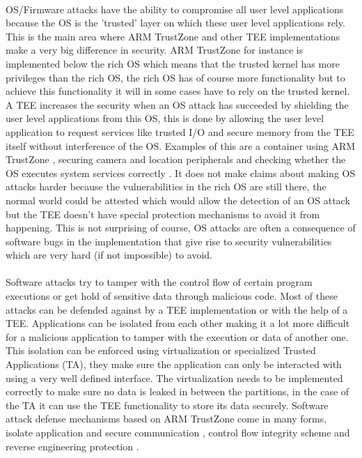 \paragraph*{}
OS/Firmware attacks have the ability to compromise all user level applications because the OS is the 'trusted' layer on which these user level applications rely. This is the main area where ARM TrustZone and other TEE implementations make a very big difference in security. ARM TrustZone for instance is implemented below the rich OS which means that the trusted kernel has more privileges than the rich OS, the rich OS has of course more functionality but to achieve this functionality it will in some cases have to rely on the trusted kernel. A TEE increases the security when an OS attack has succeeded by shielding the user level applications from this OS, this is done by allowing the user level application to request services like trusted I/O and secure memory from the TEE itself without interference of the OS. Examples of this are a container using ARM TrustZone \cite{HuaZhichao2021Tpcf}, securing camera and location peripherals \cite{SalmanAmmarS2021SMSG} and checking whether the OS executes system services correctly \cite{GuanLe2017TSEo}. It does not make claims about making OS attacks harder because the vulnerabilities in the rich OS are still there, the normal world could be attested which would allow the detection of an OS attack but the TEE doesn't have special protection mechanisms to avoid it from happening. This is not surprising of course, OS attacks are often a consequence of software bugs in the implementation that give rise to security vulnerabilities which are very hard (if not impossible) to avoid.

\paragraph*{}
Software attacks try to tamper with the control flow of certain program executions or get hold of sensitive data through malicious code. Most of these attacks can be defended against by a TEE implementation or with the help of a TEE. Applications can be isolated from each other making it a lot more difficult for a malicious application to tamper with the execution or data of another one. This isolation can be enforced using virtualization or specialized Trusted Applications (TA), they make sure the application can only be interacted with using a very well defined interface. The virtualization needs to be implemented correctly to make sure no data is leaked in between the partitions, in the case of the TA it can use the TEE functionality to store its data securely. Software attack defense mechanisms based on ARM TrustZone come in many forms, isolate application and secure communication \cite{ZhangDiming2020iIfs}, control flow integrity scheme \cite{KawadaTomoaki2020TRCI} and reverse engineering protection \cite{BenYehudaRaz2019Pare}.

